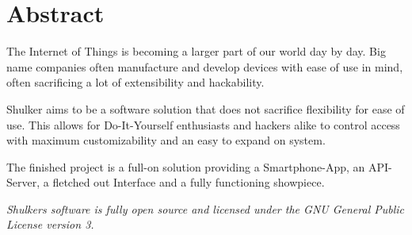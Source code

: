 \section*{Abstract}

The Internet of Things is becoming a larger part of our world day by day. Big name companies often manufacture and develop devices with ease of use in mind, often sacrificing a lot of extensibility and hackability.

Shulker aims to be a software solution that does not sacrifice flexibility for ease of use. This allows for Do-It-Yourself enthusiasts and hackers alike to control access with maximum customizability and an easy to expand on system.

The finished project is a full-on solution providing a Smartphone-App, an API-Server, a fletched out Interface and a fully functioning showpiece.

\textit{Shulkers software is fully open source and licensed under the GNU General Public License version 3.}

\newpage